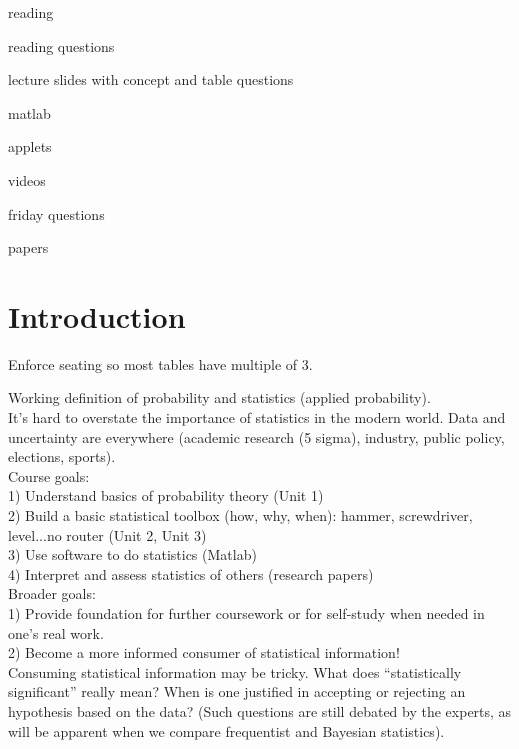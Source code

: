 \documentclass[12pt]{article}
\begin{document}
reading

reading questions

lecture slides with concept and table questions

matlab

applets

videos

friday questions

papers

\setcounter{section}{-1}

\section{Introduction}

Enforce seating so most tables have multiple of 3.

Working definition of probability and statistics (applied probability). \\

It's hard to overstate the importance of statistics in the modern world.  Data and uncertainty are everywhere (academic research (5 sigma), industry, public policy, elections, sports).  \\

Course goals: \\
1) Understand basics of probability theory (Unit 1) \\
2) Build a basic statistical toolbox (how, why, when): hammer, screwdriver, level...no router (Unit 2, Unit 3) \\
3) Use software to do statistics (Matlab) \\
4) Interpret and assess statistics of others (research papers) \\

Broader goals: \\
1) Provide foundation for further coursework or for self-study when needed in one's real work.\\
2) Become a more informed consumer of statistical information! \\

Consuming statistical information may be tricky.  What does ``statistically significant'' really mean?  When is one justified in accepting or rejecting an hypothesis based on the data? (Such questions are still debated by the experts, as will be apparent when we compare frequentist and Bayesian statistics). \\

\end{document}
